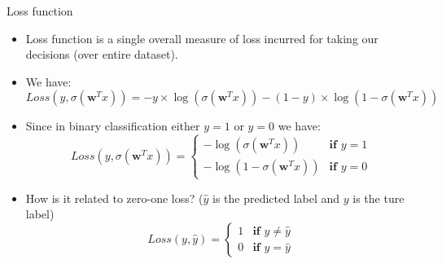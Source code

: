 \documentclass[serif, aspectratio=169]{beamer}
\begin{document}

    \begin{frame}{Loss function}
        \begin{itemize}
            \item Loss function is a single overall measure of loss incurred for taking our decisions (over entire dataset).
            \item We have:
            \[ Loss(y, \sigma (\mathbf{w}^T x)) = -y \times \log (\sigma ( \mathbf{w}^T x)) - (1-y) \times \log
            (1 - \sigma (\mathbf{w}^T x))
            \]

            \item Since in binary classification either $y=1$ or $y=0$ we have:
            \[
                Loss(y, \sigma (\mathbf{w}^T x)) = \begin{cases}
                                                       - \log (\sigma (\mathbf{w}^T x)) & \textbf{if } y = 1 \\
                                                       - \log (1 - \sigma (\mathbf{w}^T x)) & \textbf{if } y = 0
                \end{cases}
            \]
            \item How is it related to zero-one loss? ($\hat{y}$ is the predicted label and $y$ is the ture label)
            \[
                Loss(y, \hat{y}) =  \begin{cases}
                                        1 & \textbf{if } y \neq \hat{y} \\
                                        0 & \textbf{if } y = \hat{y}
                \end{cases}
            \]
        \end{itemize}
    \end{frame}


\end{document}
